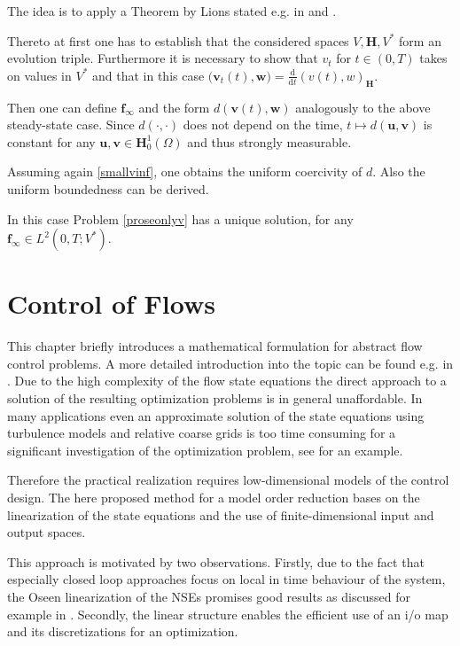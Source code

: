 \documentclass[a4paper,10pt,BCOR=15mm]{scrbook}
\providecommand{\inva}[1]{\text{d} #1}
\begin{document}
The idea is to apply a Theorem by Lions stated e.g. in \cite[p. 219]{emmr} and \cite[p. 424]{zeid}. 

Thereto at first one has to establish that the considered spaces $V, \mathbf H,V^*$ form an evolution triple. Furthermore it is necessary to show that $v_t$ for $t\in(0,T)$ takes on values in $V^*$ and that in this case $( \mathbf v_t(t), \mathbf w \bigr) = \frac{\text{d}}{\inva{t}}(v(t),w)_\mathbf H$. 

Then one can define $\mathbf f_\infty$ and the form $d(\mathbf v(t), \mathbf w)$ analogously to the above steady-state case. Since $d(\cdot,\cdot)$ does not depend on the time, $t \mapsto d(\mathbf u, \mathbf v)$ is constant for any $\mathbf u,\mathbf v \in \mathbf H_0^1(\Omega)$ and thus strongly measurable. 

Assuming again \eqref{smallvinf}, one obtains the uniform coercivity of $d$. Also the uniform boundedness can be derived. 

In this case Problem \ref{proseonlyv} has a unique solution, for any $\mathbf f_\infty \in L^2(0,T;V^*)$.

\section{Control of Flows}
This chapter briefly introduces a mathematical formulation for abstract flow control problems. A more detailed introduction into the topic can be found e.g. in \cite{gunzo}. Due to the high complexity of the flow state equations the direct approach to a solution of the resulting optimization problems is in general unaffordable. In many applications even an approximate solution of the state equations using turbulence models and relative coarse grids is too time consuming for a significant investigation of the optimization problem, see \cite{moi} for an example.

Therefore the practical realization requires low-dimensional models of the control design. The here proposed method for a model order reduction bases on the linearization of the state equations and the use of finite-dimensional input and output spaces.

This approach is motivated by two observations. Firstly, due to the fact that especially closed loop approaches focus on local in time behaviour of the system, the Oseen linearization of the NSEs promises good results as discussed for example in \cite{locnsecon}. Secondly, the linear structure enables the efficient use of an i/o map and its discretizations for an optimization.
\end{document}
